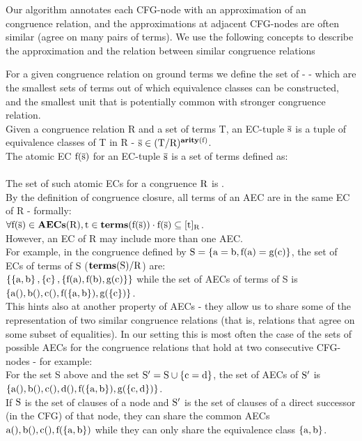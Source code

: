 Our algorithm annotates each CFG-node with an approximation of an congruence relation, and the approximations at adjacent CFG-nodes are often similar (agree on many pairs of terms). We use the following concepts to describe the approximation and the relation between similar congruence relations

For a given congruence relation on ground terms we define the set of  - \newdef{\AEC} - which are the smallest sets of terms out of which equivalence classes can be constructed, and the smallest unit that is potentially common with stronger congruence relation.\\
Given a congruence relation R and a set of terms T, an EC-tuple $\mathrm{\overline{s}}$ is a tuple of equivalence classes of T in R - $\mathrm{\mathrm{\overline{s}} \in (T/R)^{\mathbf{arity}(\mathrm{f})}}$.\\
The atomic EC $\mathrm{f}(\mathrm{\overline{s}})$ for an EC-tuple $\mathrm{\overline{s}}$ is a set of terms defined as:\\
 \\
The set of such atomic ECs for a congruence $\mathrm{R}$ is .\\
By the definition of congruence closure, all terms of an AEC are in the same EC of R - formally:\\
$\mathrm{\forall \mathrm{f}(\mathrm{\overline{s}}) \in \mathbf{AECs}(\mathrm{R}),\mathrm{t} \in \mathbf{terms}(\mathrm{\mathrm{f}(\mathrm{\overline{s}})}) \cdot \mathrm{f}(\mathrm{\overline{s}}) \subseteq [t]_{R}}$.\\
However, an EC of R may include more than one AEC.\\
For example, in the congruence defined by $\mathrm{S = \left\{\mathrm{a=b,f(a)=g(c)}\right\}}$, the set of ECs of terms of S ($\mathrm{\mathbf{terms}(\mathrm{S})/R}$) are:\\
$\left\{\mathrm{ \left\{\mathrm{a,b}\right\}, \left\{\mathrm{c}\right\}, \left\{\mathrm{f(a),f(b),g(c)}\right\}}\right\}$ while the set of AECs of terms of S is \\
$\left\{\mathrm{a(),b(),c(),f(\left\{\mathrm{a,b}\right\}),g(\left\{\mathrm{c}\right\})}\right\}$.\\
This hints also at another property of AECs - they allow us to share some of the representation of two similar congruence relations (that is, relations that agree on some subset of equalities). 
In our setting this is most often the case of the sets of possible AECs for the congruence relations that hold at two consecutive CFG-nodes - for example: \\
For the set S above and the set $\mathrm{S' = S \cup \left\{\mathrm{c=d}\right\}}$,
the set of AECs of $\mathrm{S'}$ is $\left\{\mathrm{a(),b(),c(),d(),f(\left\{\mathrm{a,b}\right\}),g(\left\{\mathrm{c,d}\right\})}\right\}$.\\
If $\mathrm{S}$ is the set of clauses of a node and $\mathrm{S'}$ is the set of clauses of a direct successor (in the CFG) of that node, they can share the common AECs\\ $\mathrm{a(),b(),c(),f(\left\{\mathrm{a,b}\right\})}$ while they can only share the equivalence class $\mathrm{\left\{\mathrm{a,b}\right\}}$.\\
